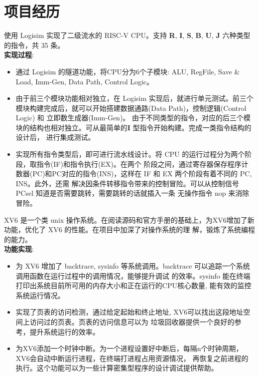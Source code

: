\documentclass{resume}
\begin{document}
\section{项目经历}
  使用 Logisim 实现了二级流水的 RISC-V CPU。支持 \textbf{R}, \textbf{I}, \textbf{S}, 
    \textbf{B}, \textbf{U}, \textbf{J} 六种类型的指令，共 35 条。 
 \\   \textbf{实现过程}:  
  \begin{itemize}
    \item 通过 Logisim 的隧道功能，将CPU分为6个子模块: ALU, RegFile,  
    Save \& Load, Imm-Gen, Data Path, Control Logic。
    \item 由于前三个模块功能相对独立，在 Logisim 实现后，就进行单元测试。前三个模块构建完成后，就可以开始搭建数据通路(Data Path)，控制逻辑(Control Logic) 和 立即数生成器(Imm-Gen)。
    由于不同类型的指令，对应的后三个模块的结构也相对独立。可从最简单的\textbf{I} 型指令开始构建。完成一类指令结构的设计后，
    进行集成测试。 
    \item 实现所有指令类型后，即可进行流水线设计。将 CPU 的运行过程分为两个阶段，取指令(IF)和指令执行(EX)。在两个
    阶段之间，通过寄存器保存程序计数器(PC)和PC对应的指令(INS)，这样在 IF 和 EX 两个阶段有着不同的 PC, INS。此外，还需
    解决因条件转移指令带来的控制冒险。可以从控制信号 PCsel 知道是否需要跳转，需要跳转的话就插入一条 无操作指令 nop 来消除冒险。 

\end{itemize}

  XV6 是一个类 unix 操作系统。在阅读源码和官方手册的基础上，为XV6增加了新功能，优化了 XV6 的性能。在项目中加深了对操作系统的理
  解，锻炼了系统编程的能力。
 \\   \textbf{功能实现}:  
\begin{itemize}
 \item 为 XV6 增加了 backtrace, sysinfo 等系统调用。backtrace 可以追踪一个系统调用函数在运行过程中的调用情况，能够提升调试
 的效率。sysinfo 能在终端打印出系统目前所可用的内存大小和正在运行的CPU核心数量, 能有效的监控系统运行情况。
 \item 实现了页表的访问检测，通过给定起始和终止地址, XV6可以找出这段地址空间上访问过的页表。页表的访问信息可以为
 垃圾回收器提供一个良好的参考，提升系统运行的效率。
 \item 为XV6添加一个时钟中断。为一个进程设置好中断后，每隔n个时钟周期，XV6会自动中断运行进程，在终端打进程占用资源情况，
 再恢复之前进程的执行。这个功能可以为一些计算密集型程序的设计调试提供帮助。
\end{itemize}
\end{document}
